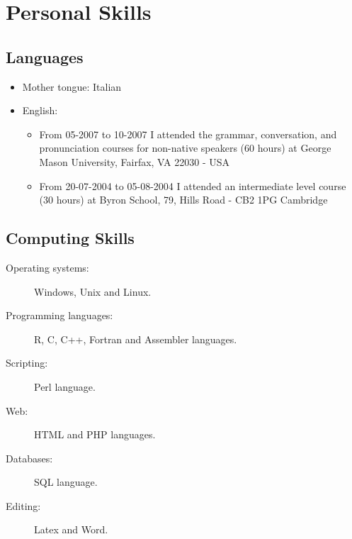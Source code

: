 \documentclass[a4paper,10pt]{article}
\begin{document}


\section*{Personal Skills}

\subsection*{Languages}
\begin{itemize}
\item Mother tongue: Italian
\item English:
  \begin{itemize}
    \item From 05-2007 to 10-2007 I attended the grammar, conversation, and pronunciation courses for non-native speakers (60 hours)
      at George Mason University, Fairfax, VA 22030 - USA
    \item From 20-07-2004 to 05-08-2004 I attended an intermediate level course (30 hours)
      at Byron School, 79, Hills Road - CB2 1PG Cambridge 
  \end{itemize}
\end{itemize}

\subsection*{Computing Skills}
\begin{description}
\item[Operating systems:] Windows, Unix and Linux.
\item[Programming languages:] R, C, C++, Fortran and Assembler languages.
\item[Scripting:]  Perl language.
\item[Web:] HTML and PHP languages.
\item[Databases:] SQL language.
\item[Editing:] Latex and Word.
\end{description}
\end{document}
